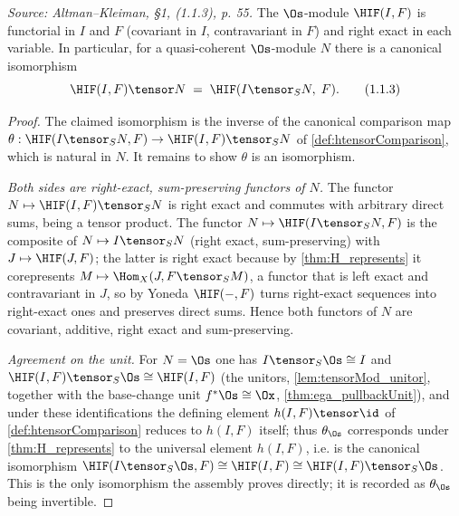 \begin{lemma}
  \label{lem:H_tensor}
  \textit{Source: Altman--Kleiman, §1, (1.1.3), p. 55.}
  The $\Os$-module $\HIF(I,F)$ is functorial in $I$ and $F$ (covariant in $I$,
  contravariant in $F$) and right exact in each variable. In particular, for a
  quasi-coherent $\Os$-module $N$ there is a canonical isomorphism
  \[
    \HIF(I,F) \tensor N \;=\; \HIF(I \tensor_S N,\; F).
    \tag{1.1.3}
  \]
  \begin{proof}
    The claimed isomorphism is the inverse of the canonical comparison map
    $\theta : \HIF(I \tensor_S N, F) \to \HIF(I,F) \tensor_S N$ of
    \cref{def:htensorComparison}, which is natural in $N$. It remains to show $\theta$ is an
    isomorphism.

    \emph{Both sides are right-exact, sum-preserving functors of $N$.} The functor
    $N \mapsto \HIF(I,F) \tensor_S N$ is right exact and commutes with arbitrary direct sums,
    being a tensor product. The functor $N \mapsto \HIF(I \tensor_S N, F)$ is the composite of
    $N \mapsto I \tensor_S N$ (right exact, sum-preserving) with $J \mapsto \HIF(J, F)$; the
    latter is right exact because by \cref{thm:H_represents} it corepresents
    $M \mapsto \Hom_X(J, F \tensor_S M)$, a functor that is left exact and contravariant in $J$,
    so by Yoneda $\HIF(-, F)$ turns right-exact sequences into right-exact ones and preserves
    direct sums. Hence both functors of $N$ are covariant, additive, right exact and
    sum-preserving.

    \emph{Agreement on the unit.} For $N = \Os$ one has $I \tensor_S \Os \cong I$ and
    $\HIF(I,F) \tensor_S \Os \cong \HIF(I,F)$ (the unitors, \cref{lem:tensorMod_unitor}, together
    with the base-change unit $f^*\Os \cong \Ox$, \cref{thm:ega_pullbackUnit}), and under these
    identifications the defining element $h(I,F) \tensor \id$ of \cref{def:htensorComparison}
    reduces to $h(I,F)$ itself; thus $\theta_{\Os}$ corresponds under \cref{thm:H_represents} to the
    universal element $h(I,F)$, i.e. is the canonical isomorphism
    $\HIF(I \tensor_S \Os, F) \cong \HIF(I,F) \cong \HIF(I,F) \tensor_S \Os$. This is the only
    isomorphism the assembly proves directly; it is recorded as $\theta_{\Os}$ being invertible.


\end{proof}
\end{lemma}
